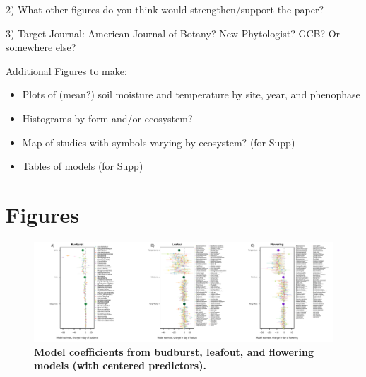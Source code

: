 \documentclass{article}
\begin{document}
2) What other figures do you think would strengthen/support the paper? %

3) Target Journal: American Journal of Botany? New Phytologist? GCB? Or somewhere else? %

\par Additional Figures to make:
 \begin{itemize}
 \item Plots of (mean?) soil moisture and temperature by site, year, and phenophase
\item Histograms by form and/or ecosystem?
 \item Map of studies with symbols varying by ecosystem? (for Supp)
\item Tables of models (for Supp)
\end{itemize}



\section*{Figures}

\begin{figure}[h]
\centering
 \includegraphics{../../Analyses/soilmoisture/figures/m5_bbdlofl.pdf}
 \caption{\textbf{Model coefficients from budburst, leafout, and flowering models (with centered predictors).}} 
 \label{fig:bblofl}
 \end{figure}
 
 
\end{document}

